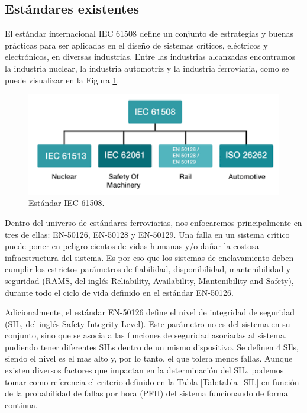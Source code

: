 \subsection{Estándares existentes}

    El estándar internacional IEC 61508 define un conjunto de estrategias y buenas prácticas para ser aplicadas en el diseño de sistemas críticos, eléctricos y electrónicos, en diversas industrias. Entre las industrias alcanzadas encontramos la industria nuclear, la industria automotriz y la industria ferroviaria, como se puede visualizar en la Figura \ref{fig:IEC_61508}.

    \begin{figure}[h]
        \centering
        \includegraphics[width=1\textwidth]{Figuras/IEC61508.png}
        \centering\caption{Estándar IEC 61508.}
        \label{fig:IEC_61508}
    \end{figure}

    Dentro del universo de estándares ferroviarias, nos enfocaremos principalmente en tres de ellas: EN-50126, EN-50128 y EN-50129. Una falla en un sistema crítico puede poner en peligro cientos de vidas humanas y/o dañar la costosa infraestructura del sistema. Es por eso que los sistemas de enclavamiento deben cumplir los estrictos parámetros de fiabilidad, disponibilidad, mantenibilidad y seguridad (RAMS, del inglés Reliability, Availability, Mantenibility and Safety), durante todo el ciclo de vida definido en el estándar EN-50126.

    Adicionalmente, el estándar EN-50126 define el nivel de integridad de seguridad (SIL, del inglés Safety Integrity Level). Este parámetro no es del sistema en su conjunto, sino que se asocia a las funciones de seguridad asociadas al sistema, pudiendo tener diferentes SILs dentro de un mismo dispositivo. Se definen 4 SIls, siendo el nivel es el mas alto y, por lo tanto, el que tolera menos fallas. Aunque existen diversos factores que impactan en la determinación del SIL, podemos tomar como referencia el criterio definido en la Tabla \ref{Tab:tabla_SIL} en función de la probabilidad de fallas por hora (PFH) del sistema funcionando de forma continua.

